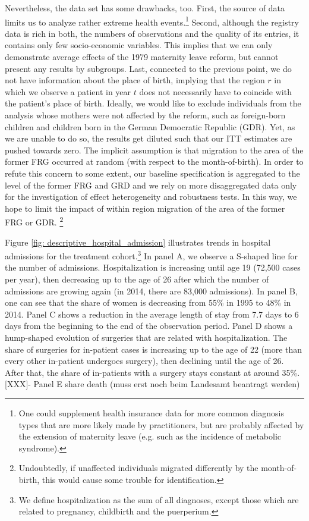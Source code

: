 \documentclass[11pt, a4paper,draft]{article} %
\begin{document}
Nevertheless, the data set has some drawbacks, too. First, the source of data limits us to analyze rather extreme health events.\footnote{One could supplement health insurance data for more common diagnosis types that are more likely made by practitioners, but are probably affected by the extension of maternity leave (e.g. such as the incidence of metabolic syndrome).} Second, although the registry data is rich in both, the numbers of observations and the quality of its entries, it contains only few socio-economic variables. This implies that we can only demonstrate average effects of the 1979 maternity leave reform, but cannot present any results by subgroups. Last, connected to the previous point, we do not have information about the place of birth, implying that the region $r$ in which we observe a patient in year $t$ does not necessarily have to coincide with the patient's place of birth. Ideally, we would like to exclude individuals from the analysis whose mothers were not affected by the reform, such as foreign-born children and children born in the German Democratic Republic (GDR). Yet, as we are unable to do so, the results get diluted such that our ITT estimates are pushed towards zero. The implicit assumption is that migration to the area of the former FRG occurred at random (with respect to the month-of-birth). In order to refute this concern to some extent, our baseline specification is aggregated to the level of the former FRG and GRD and we rely on more disaggregated data only for the investigation of effect heterogeneity and robustness tests. In this way, we hope to limit the impact of within region migration of the area of the former FRG or GDR. \footnote{Undoubtedly, if unaffected individuals migrated differently by the month-of-birth, this would cause some trouble for identification.}\newline


Figure \ref{fig: descriptive_hospital_admission} illustrates trends in hospital admissions for the treatment cohort.\footnote{We define hospitalization as the sum of all diagnoses, except those which are related to pregnancy, childbirth and the puerperium.} In panel A, we observe a S-shaped line for the number of admissions. Hospitalization is increasing until age 19 (72,500 cases per year), then decreasing up to the age of 26 after which the number of admissions are growing again (in 2014, there are 83,000 admissions). In panel B, one can see that the share of women is decreasing from 55\% in 1995 to 48\% in 2014. Panel C shows a reduction in the average length of stay from 7.7 days to 6 days from the beginning to the end of the observation period. Panel D shows a hump-shaped evolution of surgeries that are related with hospitalization. The share of surgeries for in-patient cases is increasing up to the age of 22 (more than every other in-patient undergoes surgery), then declining until the age of 26. After that, the share of in-patients with a surgery stays constant at around 35\%.
[XXX]- Panel E share death (muss erst noch beim Landesamt beantragt werden)\newline
\end{document}

